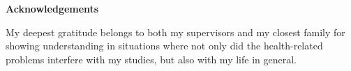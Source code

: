 \thispagestyle{empty}

\mbox{}
\vfill

\large
\noindent \textbf{Acknowledgements}
\normalsize

\noindent My deepest gratitude belongs to both my supervisors and my closest family for showing understanding in situations where not only did the health-related problems interfere with my studies, but also with my life in general.